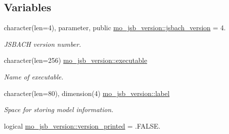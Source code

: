 \subsection*{Variables}
\begin{DoxyCompactItemize}
\item 
character(len=4), parameter, public \hyperlink{namespacemo__jsb__version_acea3b0d7b36fbbac26065f23eff8584d}{mo\+\_\+jsb\+\_\+version\+::jsbach\+\_\+version} = \textquotesingle{}4.\textquotesingle{}
\begin{DoxyCompactList}\small\item\em J\+S\+B\+A\+C\+H version number. \end{DoxyCompactList}\item 
character(len=256) \hyperlink{namespacemo__jsb__version_a8009d55d2d2f77172d38a83ad2b59efc}{mo\+\_\+jsb\+\_\+version\+::executable}
\begin{DoxyCompactList}\small\item\em Name of executable. \end{DoxyCompactList}\item 
character(len=80), dimension(4) \hyperlink{namespacemo__jsb__version_a65699e250219835c1bcfd563841df67b}{mo\+\_\+jsb\+\_\+version\+::label}
\begin{DoxyCompactList}\small\item\em Space for storing model information. \end{DoxyCompactList}\item 
logical \hyperlink{namespacemo__jsb__version_af0c80a14a6251abea4b1cf5462dedc25}{mo\+\_\+jsb\+\_\+version\+::version\+\_\+printed} = .F\+A\+L\+S\+E.
\end{DoxyCompactItemize}
